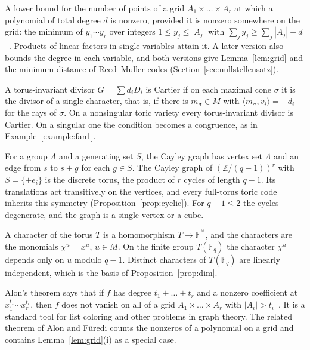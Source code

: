 \documentclass[12pt,letterpaper]{article}
\numberwithin{equation}{section}
\theoremstyle{definition}
\theoremstyle{remark}
\newcommand{\F}{\mathbb{F}}
\newcommand{\Z}{\mathbb{Z}}
\newcommand{\Fq}{\mathbb{F}_q}
\begin{document}
\begin{description}[leftmargin=1.5em,labelindent=0pt,style=nextline]
\item[Alon--F\"uredi theorem] A lower bound for the number of points of a grid
$A_1\times\dots\times A_r$ at which a polynomial of total degree $d$ is
nonzero, provided it is nonzero somewhere on the grid: the minimum of
$y_1\cdots y_r$ over integers $1\le y_j\le|A_j|$ with
$\sum_jy_j\ge\sum_j|A_j|-d$~\cite{AF93}. Products of linear factors in single
variables attain it. A later version also bounds the degree in each variable,
and both versions give Lemma~\ref{lem:grid} and the minimum distance of
Reed--Muller codes (Section~\ref{sec:nullstellensatz}).
\item[Cartier divisor] A torus-invariant divisor $G=\sum d_iD_i$ is Cartier if
on each maximal cone $\sigma$ it is the divisor of a single character, that is,
if there is $m_\sigma\in M$ with $\langle m_\sigma,v_i\rangle=-d_i$ for the
rays of $\sigma$. On a nonsingular toric variety every torus-invariant divisor
is Cartier. On a singular one the condition becomes a congruence, as in
Example~\ref{example:fan1}.
\item[Cayley graph] For a group $\Lambda$ and a generating set $S$, the Cayley
graph has vertex set $\Lambda$ and an edge from $s$ to $s+g$ for each $g\in S$.
The Cayley graph of $(\Z/(q-1))^r$ with $S=\{\pm e_i\}$ is the discrete torus,
the product of $r$ cycles of length $q-1$. Its translations act transitively
on the vertices, and every full-torus toric code inherits this symmetry
(Proposition~\ref{prop:cyclic}). For $q-1\le2$ the cycles degenerate, and the
graph is a single vertex or a cube.
\item[Character] A character of the torus $T$ is a homomorphism
$T\to\overline{\F}^\times$, and the characters are the monomials $\chi^u=x^u$,
$u\in M$. On the finite group $T(\Fq)$ the character $\chi^u$ depends only on
$u$ modulo $q-1$. Distinct characters of $T(\Fq)$ are linearly independent,
which is the basis of Proposition~\ref{prop:dim}.
\item[Combinatorial Nullstellensatz] Alon's theorem says that if $f$ has degree
$t_1+\dots+t_r$ and a nonzero coefficient at $x_1^{t_1}\cdots x_r^{t_r}$, then
$f$ does not vanish on all of a grid $A_1\times\dots\times A_r$ with
$|A_i|>t_i$~\cite{Al99}. It is a standard tool for list coloring and other
problems in graph theory. The related theorem of Alon and F\"uredi counts the
nonzeros of a polynomial on a grid and contains Lemma~\ref{lem:grid}(i) as a
special case.

\end{description}
\end{document}
